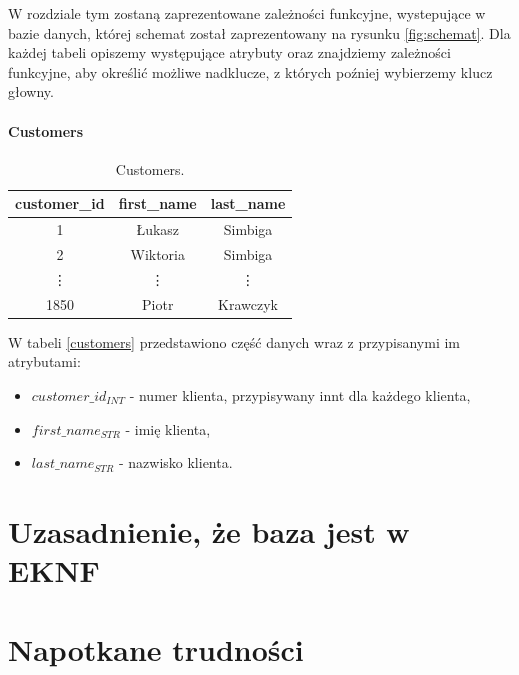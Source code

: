 \documentclass{article}
\theoremstyle{break}
\begin{document}
W rozdziale tym zostaną zaprezentowane zależności funkcyjne, wystepujące w bazie danych, której schemat został zaprezentowany na rysunku \ref{fig:schemat}. Dla każdej tabeli opiszemy występujące atrybuty oraz znajdziemy zależności funkcyjne, aby określić możliwe nadklucze, z których poźniej wybierzemy klucz głowny.

\paragraph{Customers}
\begin{table}[!ht]
    \centering
    \begin{tabular}{|c|c|c|}
    \hline
        customer_id & first_name & last_name \\ \hline
        1 & Łukasz & Simbiga\\ \hline
        2 & Wiktoria & Simbiga \\ \hline
        \vdots & \vdots & \vdots \\ \hline
        1850 & Piotr & Krawczyk \\ \hline
    \end{tabular}
    \caption{Customers.}
                \label{table:customers}
\end{table}
W tabeli \ref{customers} przedstawiono część danych wraz z przypisanymi im atrybutami:
\begin{itemize}
    \item $customer\_id_{INT}$ - numer klienta, przypisywany innt dla każdego klienta,
    \item $first\_name_{STR}$ - imię klienta,
    \item $last\_name_{STR}$ - nazwisko klienta.
\end{itemize}

\section{Uzasadnienie, że baza jest w EKNF}

\section{Napotkane trudności}
	
\end{document}
